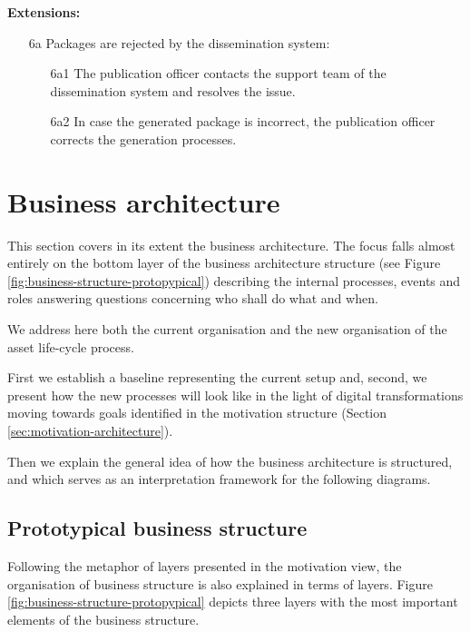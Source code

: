 	\textbf{Extensions:}
	\begin{enumerate}
		\item [6a] Packages are rejected by the dissemination system:
		\begin{enumerate}
			\item [6a1] The publication officer contacts the support team of the dissemination system and resolves the issue. 
			\item [6a2] In case the generated package is incorrect, the publication officer corrects the generation processes.
		\end{enumerate}
	\end{enumerate}
	
\section{Business architecture}
\label{sec:business-architecture}
	
	This section covers in its extent the business architecture. The focus falls almost entirely on the bottom layer of the business architecture structure (see Figure \ref{fig:business-structure-protopypical}) describing the internal processes, events and roles answering questions concerning who shall do what and when.
	
	
	We address here both the current organisation and the new organisation of the asset life-cycle process. 
	
	First we establish a baseline representing the current setup and, second, we present how the new processes will look like in the light of digital transformations moving towards goals identified in the motivation structure (Section \ref{sec:motivation-architecture}).
	
	Then we explain the general idea of how the business architecture is structured, and which serves as an interpretation framework for the following diagrams. 	
	
	\subsection{Prototypical business structure}
	
	Following the metaphor of layers presented in the motivation view, the organisation of business structure is also explained in terms of layers. Figure \ref{fig:business-structure-protopypical} depicts three layers with the most important elements of the business structure. 
	
	

